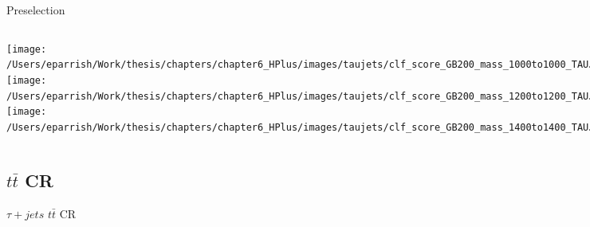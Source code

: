 \documentclass[aspectratio=169,xcolor=table]{beamer}
\begin{document}
    \begin{frame}[t]{\taujets Preselection}
      \begin{columns}[t]
          \texttt{[image: /Users/eparrish/Work/thesis/chapters/chapter6\_HPlus/images/taujets/clf\_score\_GB200\_mass\_1000to1000\_TAUJET\_PRESEL.png]}
          \texttt{[image: /Users/eparrish/Work/thesis/chapters/chapter6\_HPlus/images/taujets/clf\_score\_GB200\_mass\_1200to1200\_TAUJET\_PRESEL.png]}
          \texttt{[image: /Users/eparrish/Work/thesis/chapters/chapter6\_HPlus/images/taujets/clf\_score\_GB200\_mass\_1400to1400\_TAUJET\_PRESEL.png]}

          \texttt{[image: /Users/eparrish/Work/thesis/chapters/chapter6\_HPlus/images/taujets/clf\_score\_GB200\_mass\_1600to1600\_TAUJET\_PRESEL.png]}
          \texttt{[image: /Users/eparrish/Work/thesis/chapters/chapter6\_HPlus/images/taujets/clf\_score\_GB200\_mass\_1800to1800\_TAUJET\_PRESEL.png]}
          \texttt{[image: /Users/eparrish/Work/thesis/chapters/chapter6\_HPlus/images/taujets/clf\_score\_GB200\_mass\_2000to2000\_TAUJET\_PRESEL.png]}

          \texttt{[image: /Users/eparrish/Work/thesis/chapters/chapter6\_HPlus/images/taujets/clf\_score\_GB200\_mass\_2500to2500\_TAUJET\_PRESEL.png]}
          \texttt{[image: /Users/eparrish/Work/thesis/chapters/chapter6\_HPlus/images/taujets/clf\_score\_GB200\_mass\_3000to3000\_TAUJET\_PRESEL.png]}


      \end{columns}
    \end{frame}

  \subsection{$t\bar{t}$ CR}

    \begin{frame}[c]{$\tau+jets$ $t\bar{t}$ CR}
      \begin{table}
      \end{table}
    \end{frame}
\end{document}
